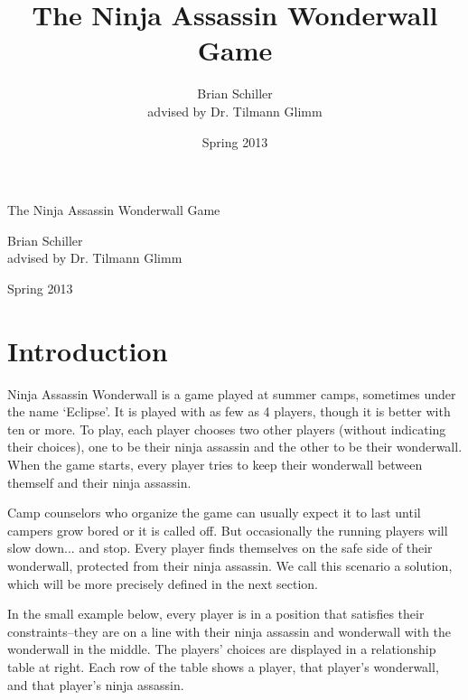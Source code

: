 \documentclass[12pt,x11names, rgb]{article}
\title{The Ninja Assassin Wonderwall Game}
\author{Brian Schiller \\ { advised by Dr. Tilmann Glimm}}
\date{Spring 2013}
\begin{document}
\begin{center}
{\LARGE The Ninja Assassin Wonderwall Game }

\large
\vspace{12pt}
Brian Schiller\\
advised by Dr. Tilmann Glimm
\vspace{6pt}

Spring 2013
\end{center}

\tableofcontents

\section{Introduction}
    Ninja Assassin Wonderwall is a game played at summer camps, sometimes under the name `Eclipse'. It is played with as few as 4 players, though it is better with ten or more. To play, each player chooses two other players (without indicating their choices), one to be their ninja assassin and the other to be their wonderwall. When the game starts, every player tries to keep their wonderwall between themself and their ninja assassin.

    Camp counselors who organize the game can usually expect it to last until campers grow bored or it is called off. But occasionally the running players will slow down... and stop. Every player finds themselves on the safe side of their wonderwall, protected from their ninja assassin. We call this scenario a solution, which will be more precisely defined in the next section.

    In the small example below, every player is in a position that satisfies their constraints--they are on a line with their ninja assassin and wonderwall with the wonderwall in the middle. The players' choices are displayed in a relationship table at right. Each row of the table shows a player, that player's wonderwall, and that player's ninja assassin.
\end{document}
